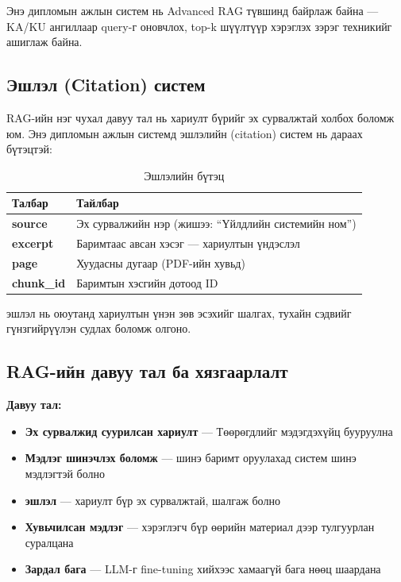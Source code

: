 \documentclass[12pt,A4]{report}
\begin{document}
Энэ дипломын ажлын систем нь Advanced RAG түвшинд байрлаж байна --- KA/KU ангиллаар query-г оновчлох, top-k шүүлтүүр хэрэглэх зэрэг техникийг ашиглаж байна.

\subsection{Эшлэл (Citation) систем}

RAG-ийн нэг чухал давуу тал нь хариулт бүрийг эх сурвалжтай холбох боломж юм. Энэ дипломын ажлын системд эшлэлийн (citation) систем нь дараах бүтэцтэй:

\begin{table}[h!]
\centering
\caption{Эшлэлийн бүтэц}
\label{tab:citation}
\begin{tabularx}{\textwidth}{>{\bfseries}l X}
\toprule
\textbf{Талбар} & \textbf{Тайлбар} \\
\midrule
\rowcolor{lightbg}
source & Эх сурвалжийн нэр (жишээ: ``Үйлдлийн системийн ном'') \\
excerpt & Баримтаас авсан хэсэг --- хариултын үндэслэл \\
\rowcolor{lightbg}
page & Хуудасны дугаар (PDF-ийн хувьд) \\
chunk\_id & Баримтын хэсгийн дотоод ID \\
\bottomrule
\end{tabularx}
\end{table}

эшлэл нь оюутанд хариултын үнэн зөв эсэхийг шалгах, тухайн сэдвийг гүнзгийрүүлэн судлах боломж олгоно.

\subsection{RAG-ийн давуу тал ба хязгаарлалт}

\textbf{Давуу тал:}

\begin{itemize}
    \item \textbf{Эх сурвалжид суурилсан хариулт} --- Төөрөгдлийг мэдэгдэхүйц бууруулна~\cite{liu2025}
    \item \textbf{Мэдлэг шинэчлэх боломж} --- шинэ баримт оруулахад систем шинэ мэдлэгтэй болно~\cite{springer2025}
    \item \textbf{эшлэл} --- хариулт бүр эх сурвалжтай, шалгаж болно
    \item \textbf{Хувьчилсан мэдлэг} --- хэрэглэгч бүр өөрийн материал дээр тулгуурлан суралцана
    \item \textbf{Зардал бага} --- LLM-г fine-tuning хийхээс хамаагүй бага нөөц шаардана~\cite{springer2025}
\end{itemize}
\end{document}
